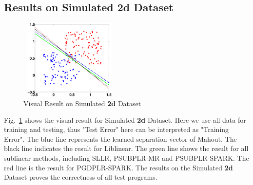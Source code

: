 \documentclass[10pt, conference, compsocconf]{IEEEtran}
\begin{document}
\subsection{Results on Simulated 2d Dataset}
%
\begin{figure}[tb] \label{fig:02}
\center \includegraphics[height=4cm,width=5cm]{img/2d-show.eps}\vspace{-0.4cm}
\caption{Visual Result on Simulated \textbf{2d} Dataset}\vspace{-0.5cm}
\end{figure}
%
Fig.~\ref{fig:02} shows the visual result for Simulated \textbf{2d} Dataset.
Here we use all data for training and testing, thus "Test Error" here can be interpreted as "Training Error".
The blue line represents the learned separation vector of Mahout.
The black line indicates the result for Liblinear.
The green line shows the result for all sublinear methods, including SLLR, PSUBPLR-MR and PSUBPLR-SPARK.
The red line is the result for PGDPLR-SPARK.
The results on the Simulated \textbf{2d} Dataset proves the correctness of all test programs.
\end{document}
